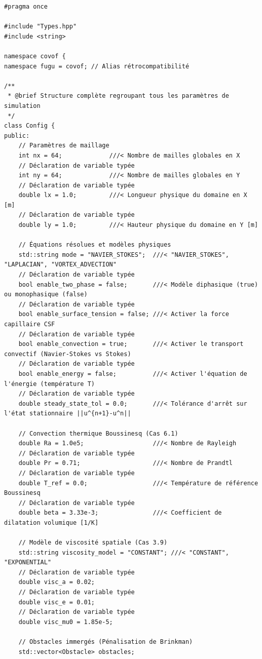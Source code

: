 \documentclass[10pt,a4paper,oneside]{book}
\begin{document}
\begin{lstlisting}[language={[11]C++}]
#pragma once

#include "Types.hpp"
#include <string>

namespace covof {
namespace fugu = covof; // Alias rétrocompatibilité

/**
 * @brief Structure complète regroupant tous les paramètres de simulation
 */
class Config {
public:
    // Paramètres de maillage
    int nx = 64;             ///< Nombre de mailles globales en X
    // Déclaration de variable typée
    int ny = 64;             ///< Nombre de mailles globales en Y
    // Déclaration de variable typée
    double lx = 1.0;         ///< Longueur physique du domaine en X [m]
    // Déclaration de variable typée
    double ly = 1.0;         ///< Hauteur physique du domaine en Y [m]

    // Équations résolues et modèles physiques
    std::string mode = "NAVIER_STOKES";  ///< "NAVIER_STOKES", "LAPLACIAN", "VORTEX_ADVECTION"
    // Déclaration de variable typée
    bool enable_two_phase = false;       ///< Modèle diphasique (true) ou monophasique (false)
    // Déclaration de variable typée
    bool enable_surface_tension = false; ///< Activer la force capillaire CSF
    // Déclaration de variable typée
    bool enable_convection = true;       ///< Activer le transport convectif (Navier-Stokes vs Stokes)
    // Déclaration de variable typée
    bool enable_energy = false;          ///< Activer l'équation de l'énergie (température T)
    // Déclaration de variable typée
    double steady_state_tol = 0.0;       ///< Tolérance d'arrêt sur l'état stationnaire ||u^{n+1}-u^n||

    // Convection thermique Boussinesq (Cas 6.1)
    double Ra = 1.0e5;                   ///< Nombre de Rayleigh
    // Déclaration de variable typée
    double Pr = 0.71;                    ///< Nombre de Prandtl
    // Déclaration de variable typée
    double T_ref = 0.0;                  ///< Température de référence Boussinesq
    // Déclaration de variable typée
    double beta = 3.33e-3;               ///< Coefficient de dilatation volumique [1/K]

    // Modèle de viscosité spatiale (Cas 3.9)
    std::string viscosity_model = "CONSTANT"; ///< "CONSTANT", "EXPONENTIAL"
    // Déclaration de variable typée
    double visc_a = 0.02;
    // Déclaration de variable typée
    double visc_e = 0.01;
    // Déclaration de variable typée
    double visc_mu0 = 1.85e-5;

    // Obstacles immergés (Pénalisation de Brinkman)
    std::vector<Obstacle> obstacles;


\end{lstlisting}
\end{document}
